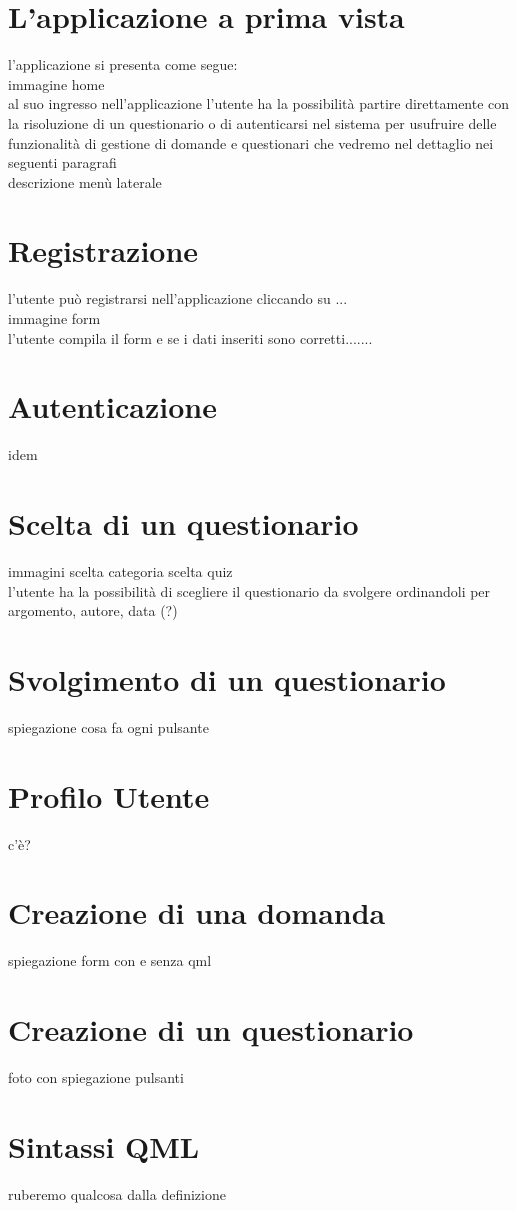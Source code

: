 \documentclass[a4paper,11pt]{article}
\begin{document}
	\section{L'applicazione a prima vista}
	l'applicazione si presenta come segue:\\
	immagine home\\
	al suo ingresso nell'applicazione l'utente ha la possibilità partire direttamente con la risoluzione di un questionario o di autenticarsi nel sistema per usufruire delle funzionalità di gestione di domande e questionari che vedremo nel dettaglio nei seguenti paragrafi\\
	descrizione menù laterale
	\newpage
	\section{Registrazione}
	l'utente può registrarsi nell'applicazione cliccando su ...\\
	immagine form\\
	l'utente compila il form e se i dati inseriti sono corretti.......
	\newpage
	\section{Autenticazione}
	idem
	\newpage
	\section{Scelta di un questionario}
	immagini scelta categoria scelta quiz\\
	l'utente ha la possibilità di scegliere il questionario da svolgere ordinandoli per argomento, autore, data (?)
	\newpage
	\section{Svolgimento di un questionario}
	spiegazione cosa fa ogni pulsante
	\newpage
	\section{Profilo Utente}
	c'è?
	\newpage
	\section{Creazione di una domanda}
	spiegazione form con e senza qml	
	\newpage
	\section{Creazione di un questionario}
	foto con spiegazione pulsanti
	\newpage
	\section{Sintassi QML}
	ruberemo qualcosa dalla definizione
\end{document}
